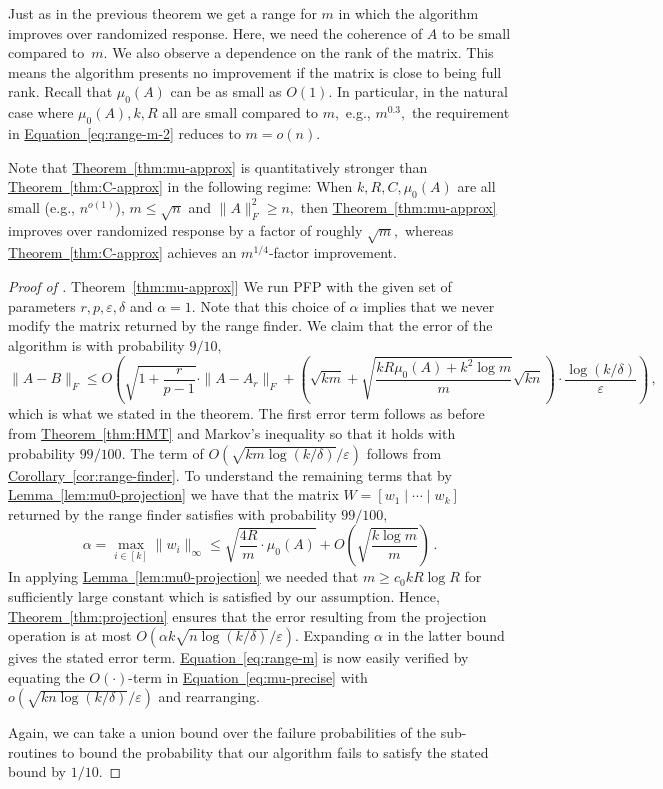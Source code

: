 \documentclass[letterpaper,11pt]{article}
\theoremstyle{definition}
\newcommand{\corollaryref}[1]{\hyperref[cor:#1]{Corollary~\ref{cor:#1}}}
\newcommand{\equationref}[1]{\hyperref[eq:#1]{Equation~\ref{eq:#1}}}
\newcommand{\lemmaref}[1]{\hyperref[lem:#1]{Lemma~\ref{lem:#1}}}
\newcommand{\theoremref}[1]{\hyperref[thm:#1]{Theorem~\ref{thm:#1}}}
\newcommand{\mper}{\,.}
\newcommand{\mcom}{\,,}
\renewcommand{\le}{\leqslant}
\renewcommand{\ge}{\geqslant}
\renewcommand{\epsilon}{\varepsilon}
\newcommand{\PFP}{\textrm{\small PFP}\xspace}
\begin{document}
Just as in the previous theorem we get a range for $m$ in which the algorithm
improves over randomized response. Here, we need the coherence of $A$ to be
small compared to~$m.$ We also observe a dependence on the rank of the matrix.
This means the algorithm presents no improvement if the matrix is close to
being full rank.  Recall that $\mu_0(A)$ can be as small as $O(1).$ In
particular, in the natural case where $\mu_0(A), k, R$ all are small compared
to $m,$ e.g., $m^{0.3},$ the requirement in \equationref{range-m-2} reduces to
$m=o(n).$

Note that \theoremref{mu-approx} is quantitatively stronger than
\theoremref{C-approx} in the following regime: When $k,R,C,\mu_0(A)$ are all
small (e.g., $n^{o(1)}$), $m\le\sqrt{n}$ and $\|A\|_F^2\ge n,$
then \theoremref{mu-approx}
improves over randomized response by a factor of roughly $\sqrt{m},$ whereas
\theoremref{C-approx} achieves an $m^{1/4}$-factor improvement.

\begin{proof}[Proof of \theoremref{mu-approx}]
We run \PFP with the given set of parameters $r,p,\epsilon,\delta$
and $\alpha=1.$ Note that this choice of $\alpha$ implies that we never modify
the matrix returned by the range finder.
We claim that the error of the algorithm is with probability $9/10,$
\[
\|A-B\|_F
\le
O\left(\sqrt{1+\frac r{p-1}}\cdot \|A-A_r\|_F
+ \left(\sqrt{km}
+ \sqrt{\frac{kR\mu_0(A)+k^2\log m}{m}}
\sqrt{kn}\right)
\cdot \frac{\log(k/\delta)}\epsilon
\right)\mcom
\]
which is what we stated in the theorem. The first error term follows as before
from \theoremref{HMT} and Markov's inequality so that it holds with
probability $99/100.$
The term of $O(\sqrt{km\log(k/\delta)}/\epsilon)$
follows from \corollaryref{range-finder}. To understand
the remaining terms that by \lemmaref{mu0-projection} we have that the matrix
$W=[w_1\mid\cdots\mid w_k]$ returned by the range finder satisfies with
probability $99/100,$
\[
\alpha= \max_{i\in[k]}\|w_i\|_\infty\le
\sqrt{\frac {4R}m\cdot\mu_0(A)}
+ O\left(\sqrt{\frac{k\log m}m}\right)\mper
\]
In applying \lemmaref{mu0-projection} we needed that $m\ge c_0kR\log R$ for
sufficiently large constant which is satisfied by our assumption.
Hence, \theoremref{projection}
ensures that the error resulting from the projection
operation is at most $O(\alpha k\sqrt{n\log(k/\delta)}/\epsilon).$ Expanding
$\alpha$ in the latter bound gives the stated error term.
\equationref{range-m} is now easily verified by
equating the $O(\cdot)$-term in \equationref{mu-precise} with
$o(\sqrt{kn\log(k/\delta)}/\epsilon)$ and rearranging.

Again, we can take a union bound over the failure probabilities of the
sub-routines to bound the probability that our algorithm fails to satisfy the
stated bound by $1/10.$
\end{proof}
\end{document}
